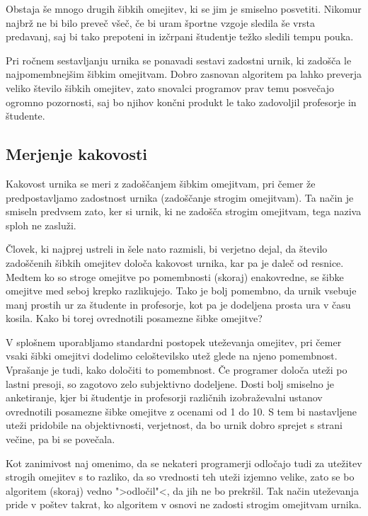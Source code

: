 \documentclass[a4paper,10pt]{article}
\begin{document}
\noindent
Obstaja še mnogo drugih šibkih omejitev, ki se jim je smiselno posvetiti. Nikomur najbrž ne
bi bilo preveč všeč, če bi uram športne vzgoje sledila še vrsta predavanj, saj bi tako
prepoteni in izčrpani študentje težko sledili tempu pouka.

Pri ročnem sestavljanju urnika se ponavadi sestavi zadostni urnik, ki zadošča le
najpomembnejšim šibkim omejitvam. Dobro zasnovan algoritem pa lahko preverja veliko
število šibkih omejitev, zato snovalci programov prav temu posvečajo ogromno pozornosti,
saj bo njihov končni produkt le tako zadovoljil profesorje in študente.

\subsection{Merjenje kakovosti}

Kakovost urnika se meri z zadoščanjem šibkim omejitvam, pri čemer že predpostavljamo
zadostnost urnika (zadoščanje strogim omejitvam). Ta način je smiseln predvsem zato,
ker si urnik, ki ne zadošča strogim omejitvam, tega naziva sploh ne zasluži.

Človek, ki najprej ustreli in šele nato razmisli, bi verjetno dejal, da število
zadoščenih šibkih omejitev določa kakovost urnika, kar pa je daleč od resnice. Medtem
ko so stroge omejitve po pomembnosti (skoraj) enakovredne, se šibke omejitve med seboj
krepko razlikujejo. Tako je bolj pomembno, da urnik vsebuje manj prostih ur za
študente in profesorje, kot pa je dodeljena prosta ura v času kosila. Kako bi torej
ovrednotili posamezne šibke omejitve?

V splošnem uporabljamo standardni postopek uteževanja omejitev, pri čemer vsaki šibki
omejitvi dodelimo celoštevilsko utež glede na njeno pomembnost. Vprašanje je tudi, kako
določiti to pomembnost. Če programer določa uteži po lastni presoji, so zagotovo zelo
subjektivno dodeljene. Dosti bolj smiselno je anketiranje, kjer bi študentje in profesorji
različnih izobraževalni ustanov ovrednotili posamezne šibke omejitve z ocenami od 1 do 10.
S tem bi nastavljene uteži pridobile na objektivnosti, verjetnost, da bo urnik dobro
sprejet s strani večine, pa bi se povečala.

Kot zanimivost naj omenimo, da se nekateri programerji odločajo tudi za utežitev strogih
omejitev s to razliko, da so vrednosti teh uteži izjemno velike, zato se bo algoritem
(skoraj) vedno ">odločil"<, da jih ne bo prekršil. Tak način uteževanja pride v poštev
takrat, ko algoritem v osnovi ne zadosti strogim omejitvam urnika.
\end{document}
